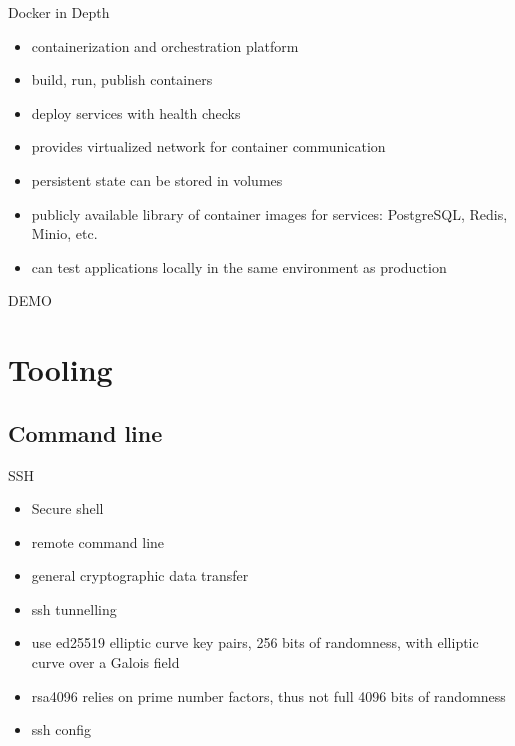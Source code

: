 \documentclass{beamer}
\begin{document}
\begin{frame}{Docker in Depth}
  \begin{itemize}
    \item containerization and orchestration platform
    \item build, run, publish containers
    \item deploy services with health checks
    \item provides virtualized network for container communication
    \item persistent state can be stored in volumes
    \item publicly available library of container images for services:
      PostgreSQL, Redis, Minio, etc.
    \item can test applications locally in the same environment as production
  \end{itemize}
\end{frame}

\begin{frame}
  \Huge DEMO
\end{frame}

\section{Tooling}

\subsection{Command line}

\begin{frame}{SSH}
  \begin{itemize}
    \item Secure shell
    \item remote command line
    \item general cryptographic data transfer
    \item ssh tunnelling
    \item use ed25519 elliptic curve key pairs, 256 bits of randomness, with
      elliptic curve over a Galois field
    \item rsa4096 relies on prime number factors, thus not full 4096 bits of
      randomness
    \item ssh config
  \end{itemize}
\end{frame}
\end{document}
